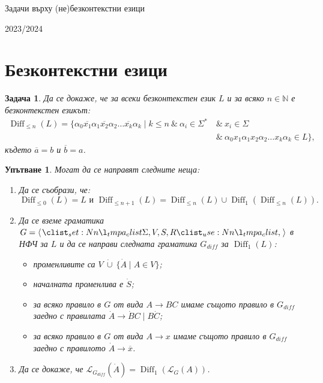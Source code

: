 \documentclass[12pt]{article}
\newtheorem{problem}{Задача}[section]
\newtheorem*{hint}{Упътване}
\theoremstyle{definition}
\begin{document}
\begin{center}
    \LARGE{Задачи върху (не)безконтекстни езици}

    \LARGE{2023/2024}
\end{center}

\section{Безконтекстни езици}

\begin{problem}
Да се докаже, че за всеки безконтекстен език $L$ и за всяко $n \in \mathbb{N}$ е безконтекстен езикът:
\begin{align*}
    \operatorname{Diff}_{\leq n}(L) = \{ \alpha_0 \overline{x_1} \alpha_1 \overline{x_2} \alpha_2 \dots \overline{x_k} \alpha_k  \mid k \leq n \:  \& \: \alpha_i \in \Sigma^* \: & \& \: x_i \in \Sigma                                                  \\
                                                                                                                                                                                  & \& \: \alpha_0 x_1 \alpha_1 x_2 \alpha_2 \dots x_k \alpha_k \in L \},
\end{align*}
където $\overline{a} = b$ и $\overline{b} = a$.
\end{problem}

\begin{hint}
    Могат да се направят следните неща:
    \begin{enumerate}
        \item Да се съобрази, че:
              \[
                  \operatorname{Diff}_{\leq 0}(L) = L \text{ и }\operatorname{Diff}_{\leq n + 1}(L) = \operatorname{Diff}_{\leq n}(L) \cup \operatorname{Diff}_1(\operatorname{Diff}_{\leq n}(L)).
              \]
        \item Да се вземе граматика $G = \opair{\Sigma, V, S, R}$ в НФЧ за $L$ и да се направи следната граматика $G_{diff}$ за $\operatorname{Diff}_1(L)$:
              \begin{itemize}
                  \item променливите са $V \: \dot \cup \: \{ \dot A \mid A \in V \}$;
                  \item началната променлива е $\dot S$;
                  \item за всяко правило в $G$ от вида $A \rightarrow BC$ имаме същото правило в $G_{diff}$ заедно с правилата $\dot A \rightarrow \dot B C \mid B \dot C$;
                  \item за всяко правило в $G$ от вида $A \rightarrow x$ имаме същото правило в $G_{diff}$ заедно с правилото $\dot A \rightarrow \overline{x}$.
              \end{itemize}
        \item Да се докаже, че $\mathcal{L}_{G_{diff}}(\dot A) = \operatorname{Diff}_1(\mathcal{L}_G(A))$.
    \end{enumerate}
\end{hint}
\end{document}
